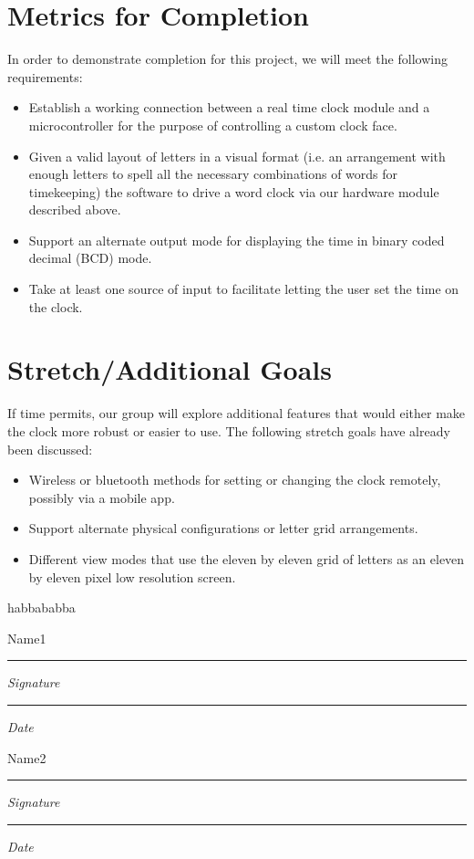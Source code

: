 \documentclass[10pt,draftclsnofoot,onecolumn]{IEEEtran}
\newcommand{\namesigdate}[2][5cm]{%
\begin{minipage}{#1}
    #2 \vspace{1.0cm}\hrule\smallskip
    \small \textit{Signature}
    \vspace{1.0cm}\hrule\smallskip
    \small \textit{Date}
\end{minipage}
}
\begin{document}
\section{Metrics for Completion}
In order to demonstrate completion for this project, we will meet the following requirements:
\begin{itemize}
  \item Establish a working connection between a real time clock module and a
  microcontroller for the purpose of controlling a custom clock face.
  \item Given a valid layout of letters in a visual format (i.e. an arrangement
  with enough letters to spell all the necessary combinations of words for
  timekeeping) the software to drive a word clock via our hardware module
  described above.
  \item Support an alternate output mode for displaying the time in binary coded
  decimal (BCD) mode.
  \item Take at least one source of input to facilitate letting the user set the
  time on the clock.
\end{itemize}

\section{Stretch/Additional Goals}
If time permits, our group will explore additional features that would either
make the clock more robust or easier to use. The following stretch goals have
already been discussed:
\begin{itemize}
  \item Wireless or bluetooth methods for setting or changing the clock remotely,
  possibly via a mobile app.
  \item Support alternate physical configurations or letter grid arrangements.
  \item Different view modes that use the eleven by eleven grid of letters as an
  eleven by eleven pixel low resolution screen.
\end{itemize}

\newpage
habbababba
\noindent \namesigdate{Name1} \hfill \namesigdate[3cm]{Name2}
\end{document}
